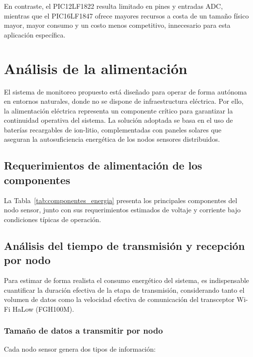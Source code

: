 En contraste, el PIC12LF1822 resulta limitado en pines y entradas ADC, mientras que el PIC16LF1847 ofrece mayores recursos a costa de un tamaño físico mayor, mayor consumo y un costo menos competitivo, innecesario para esta aplicación específica.





\section{Análisis de la alimentación}

El sistema de monitoreo propuesto está diseñado para operar de forma autónoma en entornos naturales, donde no se dispone de infraestructura eléctrica. Por ello, la alimentación eléctrica representa un componente crítico para garantizar la continuidad operativa del sistema. La solución adoptada se basa en el uso de baterías recargables de ion-litio, complementadas con paneles solares que aseguran la autosuficiencia energética de los nodos sensores distribuidos.

\subsection*{Requerimientos de alimentación de los componentes}

La Tabla~\ref{tab:componentes_energia} presenta los principales componentes del nodo sensor, junto con sus requerimientos estimados de voltaje y corriente bajo condiciones típicas de operación.




\subsection{Análisis del tiempo de transmisión y recepción por nodo}

Para estimar de forma realista el consumo energético del sistema, es indispensable cuantificar la duración efectiva de la etapa de transmisión, considerando tanto el volumen de datos como la velocidad efectiva de comunicación del transceptor Wi-Fi HaLow (FGH100M).

\subsubsection*{Tamaño de datos a transmitir por nodo}
Cada nodo sensor genera dos tipos de información:


